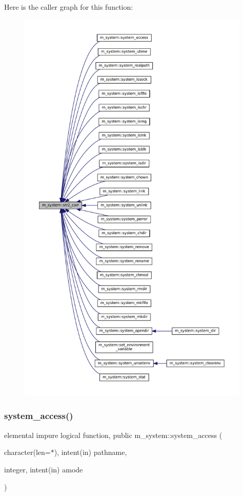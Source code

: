 Here is the caller graph for this function\+:\nopagebreak
\begin{figure}[H]
\begin{center}
\leavevmode
\includegraphics[height=550pt]{namespacem__system_a58bb591b5b9fefec3960a28361aae07a_icgraph}
\end{center}
\end{figure}
\mbox{\label{namespacem__system_a4c1c906730e61629a8277e1daeda90f6}} 
\subsubsection{\texorpdfstring{system\+\_\+access()}{system\_access()}}
{\footnotesize\ttfamily elemental impure logical function, public m\+\_\+system\+::system\+\_\+access (\begin{DoxyParamCaption}\item[{character(len=$\ast$), intent(in)}]{pathname,  }\item[{integer, intent(in)}]{amode }\end{DoxyParamCaption})}



